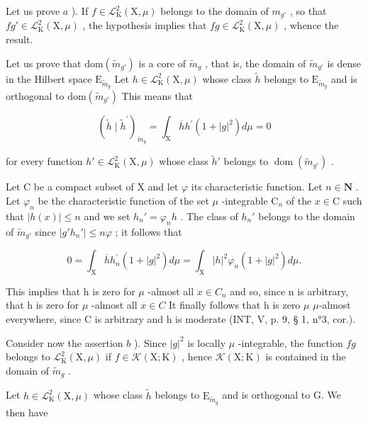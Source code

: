 Let us prove \(a\) ). If \(f \in \mathcal{L}_{\mathrm{K}}^{2}(\mathrm{X}, \mu)\) belongs to the domain of \(m_{g'}\) , so that \(fg' \in \mathcal{L}_{\mathrm{K}}^{2}(\mathrm{X}, \mu)\) , the hypothesis implies that \(fg \in \mathcal{L}_{\mathrm{K}}^{2}(\mathrm{X}, \mu)\) , whence the result.

Let us prove that \(\mathrm{dom}(\widetilde{m}_{g'})\) is a core of \(\widetilde{m}_g\) , that is, the domain of \(\widetilde{m}_{g'}\) is dense in the Hilbert space \(\mathrm{E}_{\widetilde{m}_g}\) Let \(h \in \mathcal{L}_{\mathrm{K}}^2(\mathrm{X}, \mu)\) whose class \(\widetilde{h}\) belongs to \(\mathrm{E}_{\widetilde{m}_g}\) and is orthogonal to \(\mathrm{dom}(\widetilde{m}_{g'})\) This means that

\[
(\widetilde {h} \mid \widetilde {h} ^ {\prime}) _ {\widetilde {m} _ {g}} = \int_ {\mathrm{X}} \overline {{h}} h ^ {\prime} (1 + | g | ^ {2}) d \mu = 0
\]

for every function \(h' \in \mathcal{L}_{\mathrm{K}}^{2}(\mathrm{X}, \mu)\) whose class \(\widetilde{h}'\) belongs to \(\operatorname{dom}(\widetilde{m}_{g'})\) .

Let C be a compact subset of X and let \(\varphi\) its characteristic function. Let \(n \in \mathbf{N}\) . Let \(\varphi_n\) be the characteristic function of the set \(\mu\) -integrable \(\mathrm{C}_n\) of the \(x \in \mathrm{C}\) such that \(|h(x)| \leqslant n\) and we set \(h_n' = \varphi_n h\) . The class of \(h_n'\) belongs to the domain of \(\tilde{m}_{g'}\) since \(|g'h_n'| \leqslant n\varphi\) ; it follows that

\[
0 = \int_ {\mathrm{X}} \overline {{h}} h _ {n} ^ {\prime} (1 + | g | ^ {2}) d \mu = \int_ {\mathrm{X}} | h | ^ {2} \varphi_ {n} (1 + | g | ^ {2}) d \mu .
\]

This implies that h is zero for \(\mu\) -almost all \(x \in C_{n}\) and so, since n is arbitrary, that h is zero for \(\mu\) -almost all \(x \in C\) It finally follows that h is zero \(\mu\) \(\mu\)-almost everywhere, since C is arbitrary and h is moderate (INT, V, p. 9, § 1, n°3, cor.).

Consider now the assertion \(b\) ). Since \(|g|^2\) is locally \(\mu\) -integrable, the function \(fg\) belongs to \(\mathcal{L}_{\mathrm{K}}^{2}(\mathrm{X},\mu)\) if \(f\in\mathcal{K}(\mathrm{X};\mathrm{K})\) , hence \(\mathcal{K}(\mathrm{X};\mathrm{K})\) is contained in the domain of \(\widetilde{m}_{g}\) .

Let \(h \in \mathcal{L}_{\mathrm{K}}^{2}(\mathrm{X}, \mu)\) whose class \(\widetilde{h}\) belongs to \(\mathrm{E}_{\widetilde{m}_{g}}\) and is orthogonal to G. We then have

